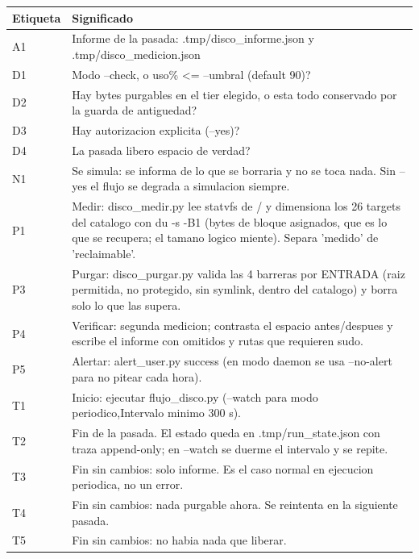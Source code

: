 \documentclass[11pt,a4paper]{article}
\begin{document}
\vspace{6pt}
\begin{tcolorbox}[cajaContenido, title={\faIcon{table}~Leyenda de etiquetas}]
\small
\begin{tabularx}{\linewidth}{@{}>{\centering\arraybackslash}p{1.4cm}X@{}}
\toprule
\textbf{Etiqueta} & \textbf{Significado} \\ \midrule
A1 & Informe de la pasada: .tmp/disco\_informe.json y .tmp/disco\_medicion.json \\
D1 & Modo --check, o uso\% <= --umbral (default 90)? \\
D2 & Hay bytes purgables en el tier elegido, o esta todo conservado por la guarda de antiguedad? \\
D3 & Hay autorizacion explicita (--yes)? \\
D4 & La pasada libero espacio de verdad? \\
N1 & Se simula: se informa de lo que se borraria y no se toca nada. Sin --yes el flujo se degrada a simulacion siempre. \\
P1 & Medir: disco\_medir.py lee statvfs de / y dimensiona los 26 targets del catalogo con du -s -B1 (bytes de bloque asignados, que es lo que se recupera; el tamano logico miente). Separa 'medido' de 'reclaimable'. \\
P3 & Purgar: disco\_purgar.py valida las 4 barreras por ENTRADA (raiz permitida, no protegido, sin symlink, dentro del catalogo) y borra solo lo que las supera. \\
P4 & Verificar: segunda medicion; contrasta el espacio antes/despues y escribe el informe con omitidos y rutas que requieren sudo. \\
P5 & Alertar: alert\_user.py success (en modo daemon se usa --no-alert para no pitear cada hora). \\
T1 & Inicio: ejecutar flujo\_disco.py (--watch para modo periodico,Intervalo minimo 300 s). \\
T2 & Fin de la pasada. El estado queda en .tmp/run\_state.json con traza append-only; en --watch se duerme el intervalo y se repite. \\
T3 & Fin sin cambios: solo informe. Es el caso normal en ejecucion periodica, no un error. \\
T4 & Fin sin cambios: nada purgable ahora. Se reintenta en la siguiente pasada. \\
T5 & Fin sin cambios: no habia nada que liberar. \\
\bottomrule
\end{tabularx}
\end{tcolorbox}
\end{document}
